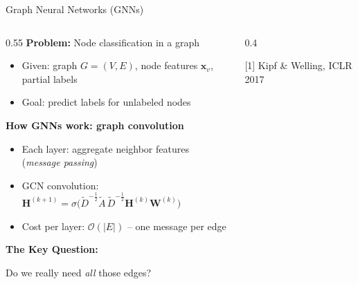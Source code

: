 \documentclass[aspectratio=169]{beamer}
\begin{document}
\begin{frame}[shrink=5]{\faMicrochip \quad Graph Neural Networks (GNNs)}
    \begin{columns}[T]
        \begin{column}{0.55\textwidth}
            \textbf{\textcolor{cyanneon}{Problem:}} Node classification in a graph
            \begin{itemize}\setlength{\itemsep}{1pt}
                \item Given: graph $G=(V,E)$, node features $\mathbf{x}_v$, partial labels
                \item Goal: predict labels for unlabeled nodes
            \end{itemize}

            \vspace{0.15cm}
            \textbf{\textcolor{cyanneon}{How GNNs work: graph convolution}}
            \begin{itemize}\setlength{\itemsep}{1pt}
                \item Each layer: \alert{aggregate} neighbor features (\emph{message passing})
                \item GCN convolution: $\mathbf{H}^{(k+1)} = \sigma\!\bigl(\tilde{D}^{-\frac{1}{2}}\tilde{A}\,\tilde{D}^{-\frac{1}{2}}\mathbf{H}^{(k)}\mathbf{W}^{(k)}\bigr)$
                \item Cost per layer: $\mathcal{O}(|E|)$ -- one message per edge
            \end{itemize}

            \vspace{0.15cm}
            \textbf{\textcolor{cyanneon}{The Key Question:}}
            \begin{center}
                \large\alert{Do we really need \emph{all} those edges?}
            \end{center}
        \end{column}
        \begin{column}{0.4\textwidth}
            \centering

            \vspace{0.3cm}
            {\scriptsize\textcolor{distillgrey}{[1] Kipf \& Welling, ICLR 2017}}
        \end{column}
    \end{columns}
\end{frame}
\end{document}
